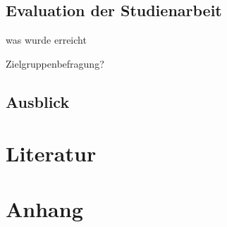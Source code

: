 \subsection{Evaluation der Studienarbeit}

was wurde erreicht

Zielgruppenbefragung?

\subsection{Ausblick}

\section{Literatur}

\section{Anhang}